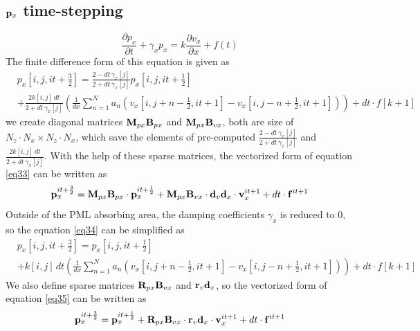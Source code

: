 \documentclass[revised,endfloat]{geophysics}
\begin{document}
\subsection{${\bf p}_x$ time-stepping}
\begin{equation}
\frac{\partial p_x}{\partial t} + \gamma_x p_x = k \frac{\partial v_x}{\partial x} + f(t) 
\label{eq32}
\end{equation}
The finite difference form of this equation is given as
\begin{equation}
\begin{split}
&p_x[i,j,it+\frac{3}{2}] = \frac{2-dt \, \gamma_x[j]}{2+dt \, \gamma_x[j]} p_x[i,j,it+\frac{1}{2}]  \\
&+ \frac{2k[i,j]\, dt}{2+dt \, \gamma_x[j]} \left(\frac{1}{dx} \sum_{n=1}^N  a_n \left(v_x[i,j+n-\frac{1}{2},it+1] - v_x[i,j-n+\frac{1}{2},it+1] \right) \right) + dt \cdot f[k+1] 
\end{split}
\label{eq33}
\end{equation}
we create diagonal matrices ${\bf M}_{px}{\bf B}_{px}$ and ${\bf M}_{px}{\bf B}_{vx}$, both are size of $N_z \cdot N_x \times N_z \cdot N_x$,  which save the elements of pre-computed $\frac{2- dt\, \gamma_x[j]}{2+ dt\, \gamma_x[j]}$ and $\frac{2k[i,j] \, dt}{2+ dt\, \gamma_x[j]}$. With the help of these sparse matrices, the vectorized form of equation \ref{eq33} can be written as
\begin{equation}
{\bf p}_x^{it+\frac{3}{2}} =  {\bf M}_{px}{\bf B}_{px} \cdot {\bf p}_x^{it+\frac{1}{2}} +  {\bf M}_{px}{\bf B}_{vx} \cdot {\bf d}_v{\bf d}_x \cdot {\bf v}_x^{it+1} + dt \cdot {\bf f}^{it+1}
\label{eq34}
\end{equation}
Outside of the PML absorbing area, the damping coefficients $\gamma_x$ is reduced to $0$, so the equation \ref{eq34} can be simplified as 
\begin{equation}
\begin{split}
&p_x[i,j,it+\frac{3}{2}] =  p_x[i,j,it+\frac{1}{2}]  \\
&+k[i,j]\, dt \left(\frac{1}{dx} \sum_{n=1}^N  a_n \left(v_x[i,j+n-\frac{1}{2},it+1] - v_x[i,j-n+\frac{1}{2},it+1] \right) \right) + dt \cdot f[k+1]
\end{split}
\label{eq35}
\end{equation}
We also define sparse matrices ${\bf R}_{px}{\bf B}_{vx}$ and ${\bf r}_{v}{\bf d}_{x}$, so the vectorized form of equation \ref{eq35} can be written as
\begin{equation}
{\bf p}_x^{it+\frac{3}{2}} =  {\bf p}_x^{it+\frac{1}{2}} +  {\bf R}_{px}{\bf B}_{vx} \cdot {\bf r}_v{\bf d}_x \cdot {\bf v}_x^{it+1} + dt \cdot {\bf f}^{it+1}
\label{eq36}
\end{equation}
\end{document}

